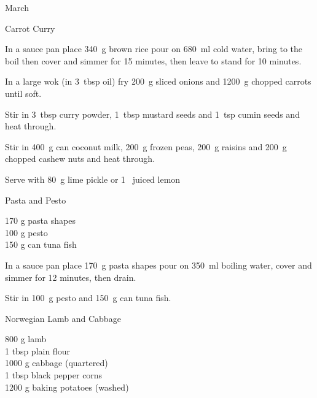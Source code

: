 \begin{menu}{March}
\begin{recipe}{2}{Carrot Curry}
    \begin{instructions}
    \item 
    In a
    sauce pan
    place
    340~g  brown rice
    pour on
    680~ml  cold water,
    bring to the boil then cover and simmer for 15 minutes,
    then leave to stand for 10 minutes.
  \item 
        In a large wok
        (in 3~tbsp  oil)
        fry
        200~g sliced onions
        and
        1200~g chopped carrots
        until soft.
      \item 
        Stir in
        3~tbsp  curry powder,
        1~tbsp  mustard seeds
        and
        1~tsp  cumin seeds
        and heat through.
      \item 
        Stir in
        400~g  can coconut milk,
        200~g  frozen peas,
        200~g  raisins
        and
        200~g chopped cashew nuts
        and heat through.
      \item 
        Serve with 80~g  lime pickle
        or
        1~ juiced lemon
    \end{instructions}
    \end{recipe}%
  
    \begin{recipe}{1}{Pasta and Pesto}%
		\begin{ingredients}
		170 g pasta shapes  \\
	100 g pesto  \\
	150 g can tuna fish  \\
	
		\end{ingredients}
	
	
    \begin{instructions}
    \item 
    In a
    sauce pan
    place
    170~g  pasta shapes
    pour on
    350~ml  boiling water,
    cover and simmer for 12 minutes, then drain.
  \item 
        Stir in
        100~g  pesto and
        150~g  can tuna fish.
      
    \end{instructions}
    \end{recipe}%
  
    \begin{recipe}{2}{Norwegian Lamb and Cabbage}%
		\begin{ingredients}
		800 g lamb  \\
	1 tbsp plain flour  \\
	1000 g cabbage (quartered) \\
	1 tbsp black pepper corns  \\
	1200 g baking potatoes (washed) \\
	

\end{ingredients}
\end{recipe}
\end{menu}
